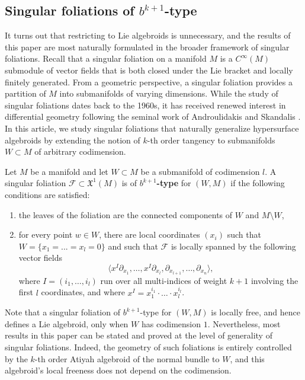 \documentclass[10pt]{amsart}
\newcommand{\ff}{\mathcal{F}}
\newcommand{\inp}[1]{\langle #1\rangle}
\numberwithin{theoremalpha}{section}
\numberwithin{equation}{section}
\numberwithin{definition}{section}
\numberwithin{theorem}{section}
\numberwithin{proposition}{section}
\numberwithin{lemma}{section}
\numberwithin{example}{section}
\numberwithin{remark}{section}
\numberwithin{corollary}{section}
\numberwithin{question}{section}
\numberwithin{problem}{section}
\numberwithin{assumption}{section}
\theoremstyle{named}
\numberwithin{equation}{section}
\begin{document}
\subsection{Singular foliations of $b^{k+1}$-type}
It turns out that restricting to Lie algebroids is unnecessary, and the results of this paper are most naturally formulated in the broader framework of singular foliations. Recall that a singular foliation on a manifold $M$ is a $C^{\infty}(M)$ submodule of vector fields that is both closed under the Lie bracket and locally finitely generated. From a geometric perspective, a singular foliation provides a partition of $M$ into submanifolds of varying dimensions. While the study of singular foliations dates back to the 1960s, it has received renewed interest in differential geometry following the seminal work of Androulidakis and Skandalis \cite{AS09}. In this article, we study singular foliations that naturally generalize hypersurface algebroids by extending the notion of $k$-th order tangency to submanifolds $W \subset M$ of arbitrary codimension. 

\begin{definition}\label{def:typek}
Let $M$ be a manifold and let $W \subset M$ be a submanifold of codimension $l$. A singular foliation $\ff \subset \mathfrak{X}^1(M)$ is of \textbf{$b^{k+1}$-type} for $(W,M)$ if the following conditions are satisfied: 
\begin{enumerate}
\item the leaves of the foliation are the connected components of $W$ and $M \setminus W$, 
\item for every point $w \in W$, there are local coordinates $(x_{i})$ such that $W = \{ x_{1} = ... = x_{l} = 0 \}$ and such that $\ff$ is locally spanned by the following vector fields 
\[
\inp{x^I\partial_{x_1},\ldots,x^I\partial_{x_l},\partial_{x_{l+1}},\ldots,\partial_{x_n}},
\]
where $I = (i_1,\ldots,i_l)$ run over all multi-indices of weight $k + 1$ involving the first $l$ coordinates, and where $x^I = x_1^{i_1}\cdot \ldots \cdot x_l^{i_l}$. \hfill \qedhere
\end{enumerate}
\end{definition}

Note that a singular foliation of $b^{k+1}$-type for $(W, M)$ is locally free, and hence defines a Lie algebroid, only when $W$ has codimension $1$. Nevertheless, most results in this paper can be stated and proved at the level of generality of singular foliations. Indeed, the geometry of such foliations is entirely controlled by the $k$-th order Atiyah algebroid of the normal bundle to $W$, and this algebroid's local freeness does not depend on the codimension. 
\end{document}
